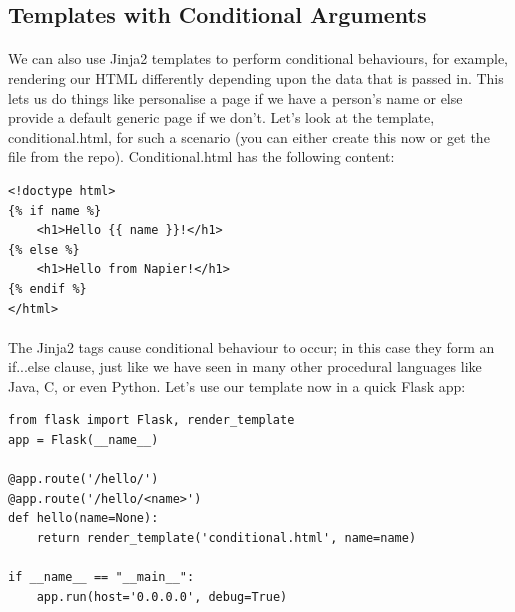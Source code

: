 \documentclass[12pt, a4paper, oneside]{book}
\begin{document}
{\subsection{Templates with Conditional Arguments}
\label{templates-conditional}
\paragraph{} We can also use Jinja2 templates to perform conditional behaviours, for example, rendering our HTML differently depending upon the data that is passed in. This lets us do things like personalise a page if we have a person's name or else provide a default generic page if we don't. Let's look at the template, conditional.html, for such a scenario (you can either create this now or get the file from the repo). Conditional.html has the following content:

\begin{lstlisting}
<!doctype html>
{% if name %}
    <h1>Hello {{ name }}!</h1>
{% else %}
    <h1>Hello from Napier!</h1>
{% endif %}
</html>
\end{lstlisting}

\paragraph{} The Jinja2 tags cause conditional behaviour to occur; in this case they form an if...else clause, just like we have seen in many other procedural languages like Java, C, or even Python. Let's use our template now in a quick Flask app:

\begin{lstlisting}
from flask import Flask, render_template
app = Flask(__name__)

@app.route('/hello/')
@app.route('/hello/<name>')
def hello(name=None):
    return render_template('conditional.html', name=name)

if __name__ == "__main__":
    app.run(host='0.0.0.0', debug=True)
\end{lstlisting}

}
\end{document}
